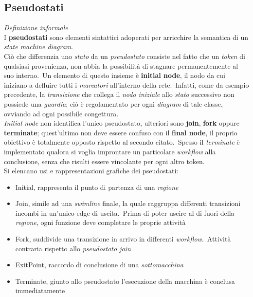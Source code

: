\documentclass{article}
\begin{document}
\subsection*{Pseudostati}
\large
\textit{Definizione informale}\\I \textbf{pseudostati} sono elementi sintattici adoperati per arricchire la semantica di un \textit{state machine diagram}.\vspace*{14pt}\\
Ciò che differenzia uno \textit{stato} da un \textit{pseudostato} consiste nel fatto che un \textit{token} di qualsiasi provenienza, non abbia la possibilità di stagnare permanentemente al suo interno.\ Un elemento di questo insieme è \textbf{initial node}, il nodo da cui iniziano a defluire tutti i \textit{marcatori} all'interno della rete.\ Infatti, come da esempio precedente, la \textit{transizione} che collega il \textit{nodo iniziale} allo \textit{stato} successivo non possiede una \textit{guardia}; ciò è regolamentato per ogni \textit{diagram} di tale classe, ovviando ad ogni possibile congettura.\vspace*{14pt}\\
\textit{Initial node} non identifica l'unico pseudostato, ulteriori sono \textbf{join}, \textbf{fork} oppure \textbf{terminate}; quest'ultimo non deve essere confuso con il \textbf{final node}, il proprio obiettivo è totalmente opposto rispetto al secondo citato.\ Spesso il \textit{terminate} è implementato qualora si voglia improntare un particolare \textit{workflow} alla conclusione, senza che risulti essere vincolante per ogni altro token.\vspace*{14pt}\\
Si elencano usi e rappresentazioni grafiche dei pseudostati:
\begin{itemize}[label={-}]
    \itemsep0em
    \item Initial, rappresenta il punto di partenza di una \textit{regione}
    \item Join, simile ad una \textit{swimline} finale, la quale raggruppa differenti transizioni incombi in un'unico edge di uscita.\ Prima di poter uscire al di fuori della \textit{regione}, ogni funzione deve completare le proprie attività
    \item Fork, suddivide una transizione in arrivo in differenti \textit{workflow}.\ Attività contraria rispetto allo \textit{pseudostato join}
    \item ExitPoint, raccordo di conclusione di una \textit{sottomacchina}
    \item Terminate, giunto allo pseudostato l'esecuzione della macchina è conclusa immediatamente
\end{itemize}
\end{document}
